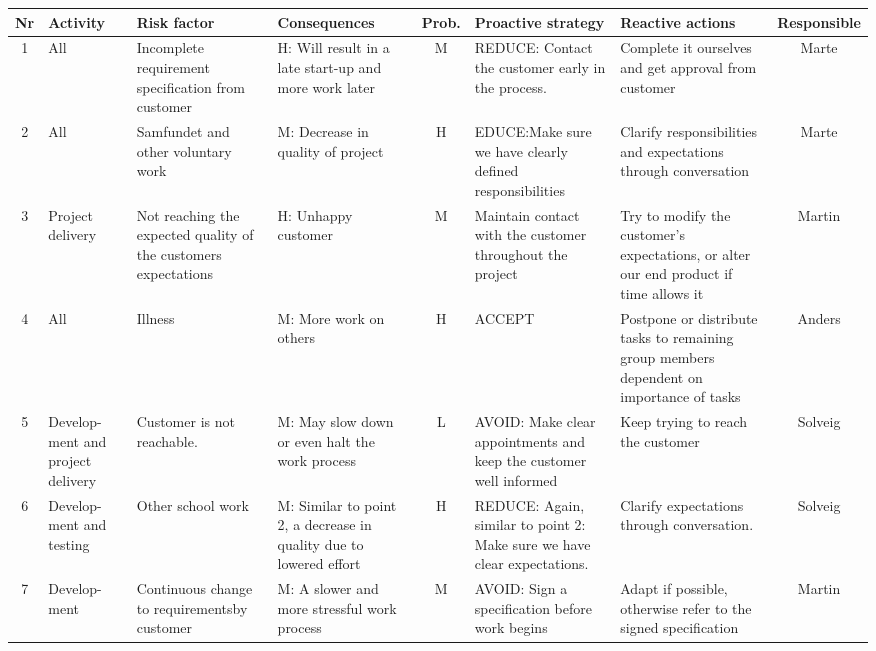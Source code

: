 \begin{landscape}
	\addtolength{\oddsidemargin}{-.8in}
	\addtolength{\topmargin}{0.5in}
  \begin{table}
	\begin{tabular}{| c | p{1.5cm} | p{4cm} | p{4cm} | c | p{4cm} | p{4cm} | c |}
    \hline
    \rowcolor{gray}
   	{\bf Nr} & {\bf Activity} & {\bf Risk factor} & {\bf Consequences} & {\bf Prob.} & {\bf Proactive strategy} & {\bf Reactive actions} & {\bf Responsible} \\ \hline

   	1 & All & Incomplete requirement specification from customer & H: Will result in a late start-up and more work later & M & REDUCE: Contact the customer early in the process. & Complete it ourselves and get approval from customer & Marte \\ \hline

   	2 & All & Samfundet and other voluntary work & M: Decrease in quality of project & H & EDUCE:Make sure we have clearly defined responsibilities & Clarify responsibilities and expectations through conversation & Marte \\ \hline

   	3 & Project delivery & Not reaching the expected quality of the customers expectations & H: Unhappy customer & M & Maintain contact with the customer throughout the project & Try to modify the customer’s expectations, or alter our end product if time allows it & Martin \\ \hline

   	4 & All & Illness & M: More work on others & H & ACCEPT & Postpone or distribute tasks to remaining group members dependent on importance of tasks & Anders \\ \hline

   	5 & Develop- ment and project delivery & Customer is not reachable. & M: May slow down or even halt the work process & L &
   	AVOID: Make clear appointments and keep the customer well informed & Keep trying to reach the customer & Solveig \\ \hline

   	6 & Develop- ment and testing & Other school work & M: Similar to point 2, a decrease in quality due to lowered effort& H & REDUCE: Again, similar to point 2: Make sure we have clear expectations. & 
	Clarify expectations through conversation. & Solveig \\ \hline

   	7 & Develop- ment & Continuous change to requirementsby customer & M: A slower and more stressful work process & M & AVOID: Sign a specification before work begins & Adapt if possible, otherwise refer to the signed specification & Martin \\ \hline


\end{tabular}
\end{table}
\end{landscape}
